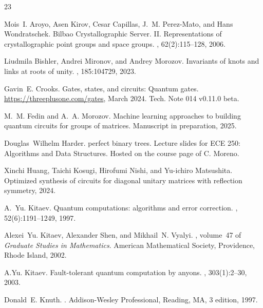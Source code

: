 \documentclass[a4paper, openany, 12pt]{article}
\theoremstyle{remark}
\theoremstyle{definition}
\begin{document}
\begin{thebibliography}{23}

Mois~I. Aroyo, Asen Kirov, Cesar Capillas, J.~M. Perez-Mato, and Hans
  Wondratschek.
\newblock Bilbao Crystallographic Server. II. Representations of
  crystallographic point groups and space groups.
, 62(2):115--128, 2006.

Liudmila Bishler, Andrei Mironov, and Andrey Morozov.
\newblock Invariants of knots and links at roots of unity.
, 185:104729, 2023.

Gavin~E. Crooks.
\newblock Gates, states, and circuits: Quantum gates.
\newblock \url{https://threeplusone.com/gates}, March 2024.
\newblock Tech. Note 014 v0.11.0 beta.

M.~M. Fedin and A.~A. Morozov.
\newblock Machine learning approaches to building quantum circuits for groups
  of matrices.
\newblock Manuscript in preparation, 2025.

Douglas~Wilhelm Harder.
 perfect binary trees.
\newblock Lecture slides for ECE 250: Algorithms and Data Structures.
\newblock Hosted on the course page of C. Moreno.

Xinchi Huang, Taichi Kosugi, Hirofumi Nishi, and Yu-ichiro Matsushita.
\newblock Optimized synthesis of circuits for diagonal unitary matrices with
  reflection symmetry, 2024.

A.~Yu. Kitaev.
\newblock Quantum computations: algorithms and error correction.
, 52(6):1191--1249, 1997.

Alexei~Yu. Kitaev, Alexander Shen, and Mikhail~N. Vyalyi.
, volume~47 of {\em Graduate
  Studies in Mathematics}.
\newblock American Mathematical Society, Providence, Rhode Island, 2002.

A.Yu. Kitaev.
\newblock Fault-tolerant quantum computation by anyons.
, 303(1):2--30, 2003.

Donald~E. Knuth.
.
\newblock Addison-Wesley Professional, Reading, MA, 3 edition, 1997.


\end{thebibliography}
\end{document}
